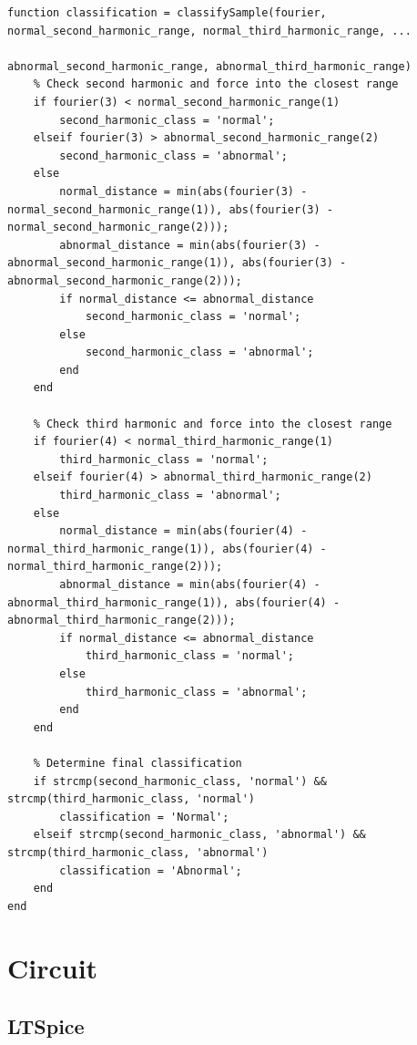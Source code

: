 \documentclass{zc-ust-hw}
\begin{document}
\begin{verbatim}
function classification = classifySample(fourier, normal_second_harmonic_range, normal_third_harmonic_range, ...
                                         abnormal_second_harmonic_range, abnormal_third_harmonic_range)
    % Check second harmonic and force into the closest range
    if fourier(3) < normal_second_harmonic_range(1)
        second_harmonic_class = 'normal';
    elseif fourier(3) > abnormal_second_harmonic_range(2)
        second_harmonic_class = 'abnormal';
    else
        normal_distance = min(abs(fourier(3) - normal_second_harmonic_range(1)), abs(fourier(3) - normal_second_harmonic_range(2)));
        abnormal_distance = min(abs(fourier(3) - abnormal_second_harmonic_range(1)), abs(fourier(3) - abnormal_second_harmonic_range(2)));
        if normal_distance <= abnormal_distance
            second_harmonic_class = 'normal';
        else
            second_harmonic_class = 'abnormal';
        end
    end
    
    % Check third harmonic and force into the closest range
    if fourier(4) < normal_third_harmonic_range(1)
        third_harmonic_class = 'normal';
    elseif fourier(4) > abnormal_third_harmonic_range(2)
        third_harmonic_class = 'abnormal';
    else
        normal_distance = min(abs(fourier(4) - normal_third_harmonic_range(1)), abs(fourier(4) - normal_third_harmonic_range(2)));
        abnormal_distance = min(abs(fourier(4) - abnormal_third_harmonic_range(1)), abs(fourier(4) - abnormal_third_harmonic_range(2)));
        if normal_distance <= abnormal_distance
            third_harmonic_class = 'normal';
        else
            third_harmonic_class = 'abnormal';
        end
    end
    
    % Determine final classification
    if strcmp(second_harmonic_class, 'normal') && strcmp(third_harmonic_class, 'normal')
        classification = 'Normal';
    elseif strcmp(second_harmonic_class, 'abnormal') && strcmp(third_harmonic_class, 'abnormal')
        classification = 'Abnormal';
    end
end
\end{verbatim}

\newpage

\section{Circuit}

\subsection{LTSpice}
\end{document}
